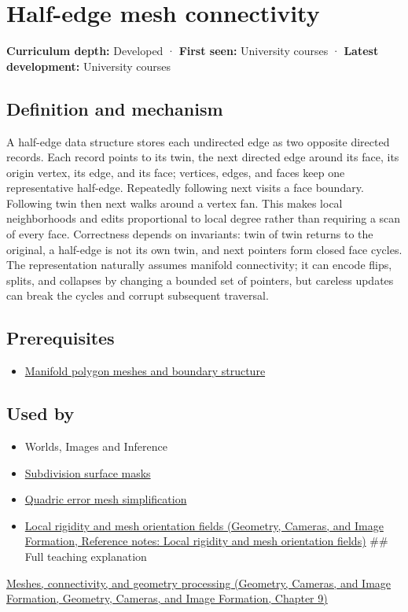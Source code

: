 \hypertarget{appendix-1aea26b2307f}{}\label{referencestart:appendix-1aea26b2307f}
\section{Half-edge mesh connectivity}\label{appendix-1aea26b2307f-half-edge-mesh-connectivity}

\textbf{Curriculum depth:} Developed · \textbf{First seen:} University courses · \textbf{Latest development:} University courses

\subsection{Definition and mechanism}\label{appendix-1aea26b2307f-definition-and-mechanism}

A half-edge data structure stores each undirected edge as two opposite directed records. Each record points to its twin, the next directed edge around its face, its origin vertex, its edge, and its face; vertices, edges, and faces keep one representative half-edge. Repeatedly following next visits a face boundary. Following twin then next walks around a vertex fan. This makes local neighborhoods and edits proportional to local degree rather than requiring a scan of every face. Correctness depends on invariants: twin of twin returns to the original, a half-edge is not its own twin, and next pointers form closed face cycles. The representation naturally assumes manifold connectivity; it can encode flips, splits, and collapses by changing a bounded set of pointers, but careless updates can break the cycles and corrupt subsequent traversal.

\subsection{Prerequisites}\label{appendix-1aea26b2307f-prerequisites}

\begin{itemize}
\tightlist
\item
  \hyperref[appendix-fab348609369]{Manifold polygon meshes and boundary structure}
\end{itemize}

\subsection{Used by}\label{appendix-1aea26b2307f-used-by}

\begin{itemize}
\item
  {Worlds, Images and Inference}
\item
  \hyperref[appendix-0234ab7f86b1]{Subdivision surface masks}
\item
  \hyperref[appendix-1dd4ad54ca57]{Quadric error mesh simplification}
\item
  \href{../03-Geometry-Cameras-and-Image-Formation/main.pdf\#nameddest=appendix-7107009c505b}{Local rigidity and mesh orientation fields (Geometry, Cameras, and Image Formation, Reference notes: Local rigidity and mesh orientation fields)} \#\# Full teaching explanation
\end{itemize}

\href{../03-Geometry-Cameras-and-Image-Formation/main.pdf\#nameddest=03-visual-computing-i-ch002-meshes-connectivity-and-geometry-processing}{Meshes, connectivity, and geometry processing (Geometry, Cameras, and Image Formation, Geometry, Cameras, and Image Formation, Chapter 9)}
